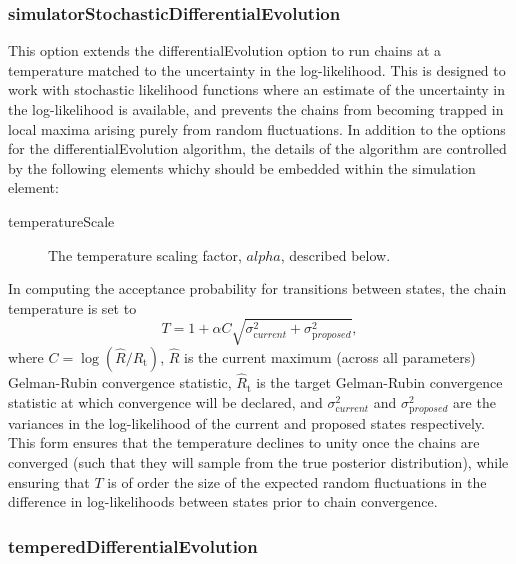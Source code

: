 \subsubsection{{\normalfont \ttfamily simulatorStochasticDifferentialEvolution}}

This option extends the {\normalfont \ttfamily differentialEvolution} option to run chains at a temperature matched to the uncertainty in the log-likelihood. This is designed to work with stochastic likelihood functions where an estimate of the uncertainty in the log-likelihood is available, and prevents the chains from becoming trapped in local maxima arising purely from random fluctuations.  In addition to the options for the {\normalfont \ttfamily differentialEvolution} algorithm, the details of the algorithm are controlled by the following elements whichy should be embedded within the {\normalfont \ttfamily simulation} element:
\begin{description}
\item[{\normalfont \ttfamily temperatureScale}] The temperature scaling factor, $alpha$, described below.
\end{description}
In computing the acceptance probability for transitions between states, the chain temperature is set to
\begin{equation}
  T = 1 + \alpha C \sqrt{\sigma^2_{\mathrm current}+\sigma^2_{\mathrm proposed}},
\end{equation}
where $C = \log(\hat{R}/\hat{R}_{\mathrm t})$, $\hat{R}$ is the current maximum (across all parameters) Gelman-Rubin convergence statistic, $\hat{R}_{\mathrm t}$ is the target Gelman-Rubin convergence statistic at which convergence will be declared, and $\sigma^2_{\mathrm current}$ and $\sigma^2_{\mathrm proposed}$ are the variances in the log-likelihood of the current and proposed states respectively. This form ensures that the temperature declines to unity once the chains are converged (such that they will sample from the true posterior distribution), while ensuring that $T$ is of order the size of the expected random fluctuations in the difference in log-likelihoods between states prior to chain convergence.

\subsubsection{{\normalfont \ttfamily temperedDifferentialEvolution}}

